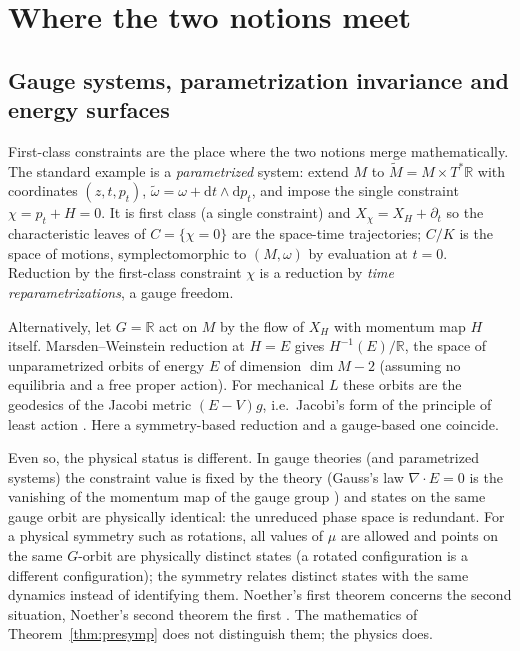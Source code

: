 \documentclass[11pt,a4paper]{article}
\numberwithin{equation}{section}
\theoremstyle{plain}
\theoremstyle{definition}
\theoremstyle{remark}
\newcommand{\R}{\mathbb{R}}
\newcommand{\dd}{\mathrm{d}}
\begin{document}
\section{Where the two notions meet}\label{sec:interplay}

\subsection{Gauge systems, parametrization invariance and energy surfaces}

First-class constraints are the place where the two notions merge mathematically. The standard example is a \emph{parametrized} system: extend $M$ to $\tilde M=M\times T^*\R$ with coordinates $(z,t,p_t)$, $\tilde\omega=\omega+\dd t\wedge\dd p_t$, and impose the single constraint $\chi=p_t+H=0$. It is first class (a single constraint) and $X_\chi=X_H+\partial_t$ so the characteristic leaves of $C=\{\chi=0\}$ are the space-time trajectories; $C/K$ is the space of motions, symplectomorphic to $(M,\omega)$ by evaluation at $t=0$. Reduction by the first-class constraint $\chi$ is a reduction by \emph{time reparametrizations}, a gauge freedom.

Alternatively, let $G=\R$ act on $M$ by the flow of $X_H$ with momentum map $H$ itself. Marsden--Weinstein reduction at $H=E$ gives $H^{-1}(E)/\R$, the space of unparametrized orbits of energy $E$ of dimension $\dim M-2$ (assuming no equilibria and a free proper action). For mechanical $L$ these orbits are the geodesics of the Jacobi metric $(E-V)g$, i.e.\ Jacobi's form of the principle of least action \cite{arnold1989,lanczos1970}. Here a symmetry-based reduction and a gauge-based one coincide.

Even so, the physical status is different. In gauge theories (and parametrized systems) the constraint value is fixed by the theory (Gauss's law $\nabla\cdot E=0$ is the vanishing of the momentum map of the gauge group \cite{henneaux1992,marsden1992}) and states on the same gauge orbit are physically identical: the unreduced phase space is redundant. For a physical symmetry such as rotations, all values of $\mu$ are allowed and points on the same $G$-orbit are physically distinct states (a rotated configuration is a different configuration); the symmetry relates distinct states with the same dynamics instead of identifying them. Noether's first theorem concerns the second situation, Noether's second theorem the first \cite{noether1918}. The mathematics of Theorem~\ref{thm:presymp} does not distinguish them; the physics does.
\end{document}
